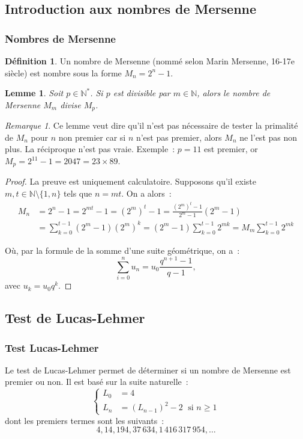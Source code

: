 \documentclass[10pt, mathserif]{beamer}
\newcommand{\N}{\mathbb N}
\newtheorem{lem}[thm]{Lemme}
\theoremstyle{definition}
\newtheorem{déf}[thm]{Définition}
\theoremstyle{remark}
\newtheorem*{rmq}{Remarque}
\begin{document}
	\subsection{Introduction aux nombres de Mersenne}
	\begin{frame}
		\frametitle{Nombres de Mersenne}
		\begin{déf}
			Un nombre de Mersenne (nommé selon Marin Mersenne, 16-17e siècle) est nombre sous la forme $M_n = 2^n-1$.
		\end{déf}

		\begin{lem}
			Soit $p \in \N^*$. Si $p$ est divisible par $m \in \N$, alors le nombre de Mersenne $M_m$ divise $M_p$.
		\end{lem}

		\begin{rmq}
			Ce lemme veut dire qu'il n'est pas nécessaire de tester la primalité de $M_n$ pour $n$ non premier car si $n$ n'est pas premier, alors $M_n$ ne
			l'est pas non plus. La réciproque n'est pas vraie. Exemple~: $p = 11$ est premier, or $M_p = 2^{11}-1 = 2047 = 23 \times 89$.
		\end{rmq}
	\end{frame}

	\begin{frame}
		\begin{proof}
			La preuve est uniquement calculatoire. Supposons qu'il existe $m, t \in \N \setminus \{1, n\}$ tels que $n = mt$. On a alors~:
			\[\begin{aligned}
				M_n &= 2^n-1
				    = 2^{mt}-1
				    = \left(2^m\right)^t - 1
					= \frac {\left(2^m\right)^t - 1}{2^m - 1}\left(2^m - 1\right) \\
					&= \sum_{k=0}^{t-1}\left(2^m - 1\right)\left(2^m\right)^k
					= \left(2^m-1\right)\sum_{k=0}^{t-1}2^{mk}
					= M_m\sum_{k=0}^{t-1}2^{mk}
			\end{aligned}\]

			Où, par la formule de la somme d'une suite géométrique, on a~:
			\[\sum_{i=0}^{n}u_n = u_0\frac {q^{n+1}-1}{q-1},\]
			avec $u_k = u_0q^k$.
		\end{proof}
	\end{frame}

	\subsection{Test de Lucas-Lehmer}
	\begin{frame}
		\frametitle{Test Lucas-Lehmer}
		Le test de Lucas-Lehmer permet de déterminer si un nombre de Mersenne est premier ou non. Il est basé sur la suite naturelle~:
		\[\begin{cases}
			L_0 &= 4 \\
			L_n &= (L_{n-1})^2 - 2 \;\text{ si } n \geq 1
		\end{cases}\]
		dont les premiers termes sont les suivants~:
		\[4, 14, 194, 37\,634, 1\,416\,317\,954, \ldots\]
	\end{frame}
\end{document}
